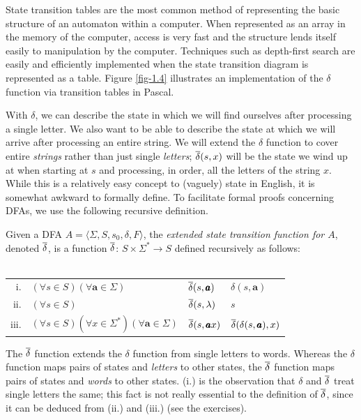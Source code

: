 State transition tables are the most common method of representing the basic
structure of an automaton within a computer. When represented as an array in the
memory of the computer, access is very fast and the structure lends itself
easily to manipulation by the computer. Techniques such as depth-first search
are easily and efficiently implemented when the state transition diagram is
represented as a table. Figure \ref{fig-1.4} illustrates an implementation of
the $\delta$ function via transition tables in Pascal.

With $\delta$, we can describe the state in which we will find ourselves after
processing a single letter. We also want to be able to describe the state at
which we will arrive after processing an entire string. We will extend the
$\delta$ function to cover entire \emph{strings} rather than just single 
\emph{letters}; $\overline{\delta}(s,x)$ will be the state we wind up at when
starting at $s$ and processing, in order, all the letters of the string $x$.
While this is a relatively easy concept to (vaguely) state in English, it is
somewhat awkward to formally define. To facilitate formal proofs concerning
DFAs, we use the following recursive definition.

\begin{dfn}\label{dfn-1.11}
Given a DFA $A=\langle\Sigma,S,s_0,\delta,F\rangle$, the \emph{extended
state transition function for $A$}, denoted $\overline{\delta}$, is a function $\overline{\delta}$:
$S\times\Sigma^*\rightarrow S$ defined recursively as follows:
\\ \\
\begin{tabular}{r@{ }l@{$\qquad$}l@{ $=$ }l}
i. & $(\forall s\in S)(\forall\pmb{a}\in\Sigma)$ & $\overline{\delta}(s,\pmb{a})$ &
	$\delta(s,\pmb{a})$ \\
ii. & $(\forall s\in S)$ & $\overline{\delta}(s,\lambda)$ & $s$ \\
iii. & $(\forall s\in S)(\forall x\in\Sigma^*)(\forall\pmb{a}\in\Sigma)$ &
	$\overline{\delta}(s,\pmb{a}x)$ & $\overline{\delta}(\delta(s,\pmb{a}),x)$
\end{tabular}
\end{dfn}

The $\overline{\delta}$ function extends the $\delta$ function from single
letters to words. Whereas the $\delta$ function maps pairs of states and
\emph{letters} to other states, the $\overline{\delta}$ function maps pairs of
states and \emph{words} to other states. (i.) is the observation that $\delta$
and $\overline{\delta}$ treat single letters the same; this fact is not really
essential to the definition of $\overline{\delta}$, since it can be deduced from
(ii.) and (iii.) (see the exercises).

